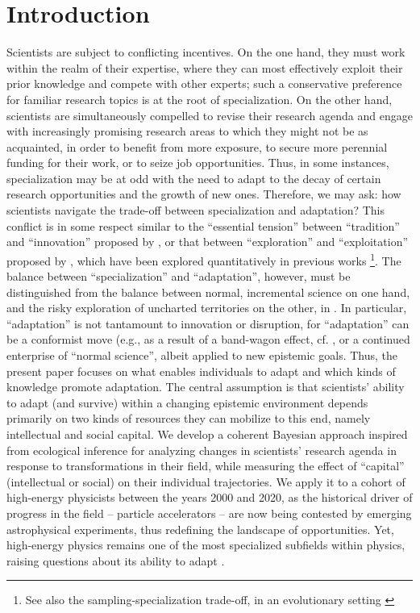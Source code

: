 \documentclass{article}
\begin{document}
\section{Introduction}

Scientists are subject to conflicting incentives. On the one hand, they must work within the realm of their expertise, where they can most effectively exploit their prior knowledge and compete with other experts; such a conservative preference for familiar research topics is at the root of specialization. On the other hand, scientists are simultaneously compelled to revise their research agenda and engage with increasingly promising research areas to which they might not be as acquainted, in order to benefit from more exposure, to secure more perennial funding for their work, or to seize job opportunities. Thus, in some instances, specialization may be at odd with the need to adapt to the decay of certain research opportunities and the growth of new ones. Therefore, we may ask: how scientists navigate the trade-off between specialization and adaptation? This conflict is in some respect similar to the ``essential tension'' between ``tradition'' and ``innovation'' proposed by \citet{Kuhn1997}, or that between ``exploration'' and ``exploitation'' proposed by \citet{March1991}, which have been explored quantitatively in previous works \citep{Foster2015,Jia2017,Aleta2019,Zeng2019,Tripodi2020,Chakresh2023,Feifan2023}\footnote{See also the sampling-specialization trade-off, in an evolutionary setting \citep{Frankenhuis2011}}. The balance between ``specialization'' and ``adaptation'', however, must be distinguished from the balance between normal, incremental science on one hand, and the risky exploration of uncharted territories on the other, in \citet{Foster2015}. In particular, ``adaptation'' is not tantamount to innovation or disruption, for ``adaptation'' can be a conformist move (e.g., as a result of a band-wagon effect, cf. \citealt{Fujimura1988}, or a continued enterprise of ``normal science'', albeit applied to new epistemic goals. Thus, the present paper focuses on what enables individuals to adapt and which kinds of knowledge promote adaptation. The central assumption is that scientists' ability to adapt (and survive) within a changing epistemic environment depends primarily on two kinds of resources they can mobilize to this end, namely intellectual and social capital. We develop a coherent Bayesian approach inspired from ecological inference for analyzing changes in scientists' research agenda in response to transformations in their field, while measuring the effect of ``capital'' (intellectual or social) on their individual trajectories. We apply it to a cohort of high-energy physicists between the years 2000 and 2020, as the historical driver of progress in the field -- particle accelerators -- are now being contested by emerging astrophysical experiments, thus redefining the landscape of opportunities. Yet, high-energy physics remains one of the most specialized subfields within physics, raising questions about its ability to adapt \citep{Battiston2019,Aleta2019}.
\end{document}
